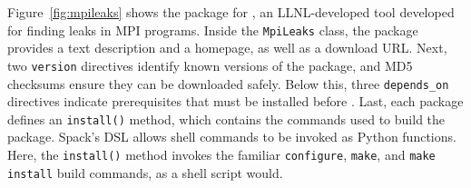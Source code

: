 Figure~\ref{fig:mpileaks} shows the package for \mpileaks, an LLNL-developed
tool developed for finding leaks in MPI programs.
Inside the {\tt MpiLeaks} class, the package provides a text description
and a homepage, as well as 
a download URL.  Next, two {\tt version} directives identify known versions
of the package, and MD5 checksums ensure they can be downloaded safely.
Below this, three {\tt depends\_on}
directives indicate prerequisites that must be installed before \mpileaks.
Last, each package defines an {\tt install()} method, which contains the
commands used to build the package.  Spack's DSL allows shell
commands to be invoked as Python functions. Here, the {\tt install()} 
method invokes the familiar {\tt configure}, {\tt make}, and
{\tt make install} build commands, as a shell script would.





